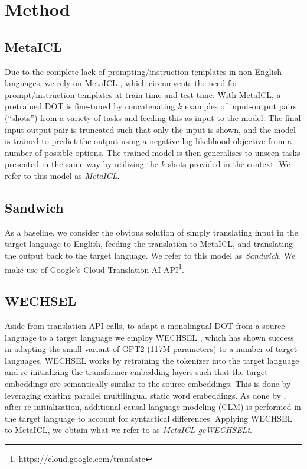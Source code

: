 \documentclass[11pt]{article}
\begin{document}
\section{Method}\label{sec:method}

\subsection{MetaICL}

Due to the complete lack of prompting/instruction templates in non-English languages, we rely on
MetaICL \citep{min_metaicl_2022}, which circumvents the need for prompt/instruction templates at
train-time and test-time. With MetaICL, a pretrained DOT is fine-tuned by concatenating $k$ examples
of input-output pairs (``shots'') from a variety of tasks and feeding this as input to the model.
The final input-output pair is truncated such that only the input is shown, and the model is trained
to predict the output using a negative log-likelihood objective from a number of possible options.
The trained model is then generalises to unseen tasks presented in the same way by utilizing the $k$
shots provided in the context.  We refer to this model as \textit{MetaICL}.

\subsection{Sandwich}

As a baseline, we consider the obvious solution of simply translating input in the target language
to English, feeding the translation to MetaICL, and translating the output back to the target
language. We refer to this model as \textit{Sandwich}. We make use of Google's Cloud Translation AI
API\footnote{\href{https://cloud.google.com/translate}{https://cloud.google.com/translate}}.

\subsection{WECHSEL}

Aside from translation API calls, to adapt a monolingual DOT from a source language to a target
language we employ WECHSEL \citep{minixhofer_wechsel_2022}, which has shown success in adapting the
small variant of GPT2 (117M parameters) to a number of target languages. WECHSEL works by retraining
the tokenizer into the target language and re-initializing the transformer embedding layers such
that the target embeddings are semantically similar to the source embeddings. This is done by
leveraging existing parallel multilingual static word embeddings. As done by
\citet{de_vries_adapting_2021}, after re-initialization, additional causal language modeling (CLM)
is performed in the target language to account for syntactical differences. Applying WECHSEL to
MetaICL, we obtain what we refer to as \textit{MetaICL-geWECHSELt}.
\end{document}
